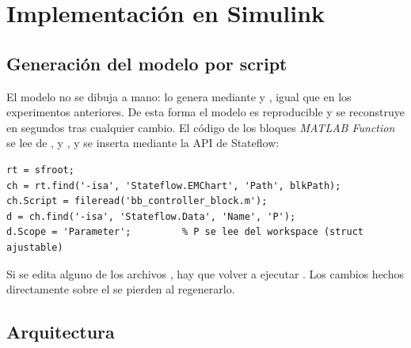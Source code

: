 \chapter{Implementación en Simulink}
\label{cap:simulink}

\section{Generación del modelo por script}

El modelo  no se dibuja a mano: lo genera  mediante  y , igual que en los experimentos anteriores. De esta forma el modelo es reproducible y se reconstruye en segundos tras cualquier cambio. El código de los bloques \emph{MATLAB Function} se lee de ,  y , y se inserta mediante la API de Stateflow:

\begin{lstlisting}[caption={Inserción del código de un bloque \emph{MATLAB Function} y declaración de \code{P} como parámetro.}]
rt = sfroot;
ch = rt.find('-isa', 'Stateflow.EMChart', 'Path', blkPath);
ch.Script = fileread('bb_controller_block.m');
d = ch.find('-isa', 'Stateflow.Data', 'Name', 'P');
d.Scope = 'Parameter';         % P se lee del workspace (struct ajustable)
\end{lstlisting}

\begin{aviso}
Si se edita alguno de los archivos , hay que volver a ejecutar . Los cambios hechos directamente sobre el  se pierden al regenerarlo.
\end{aviso}

\section{Arquitectura}


